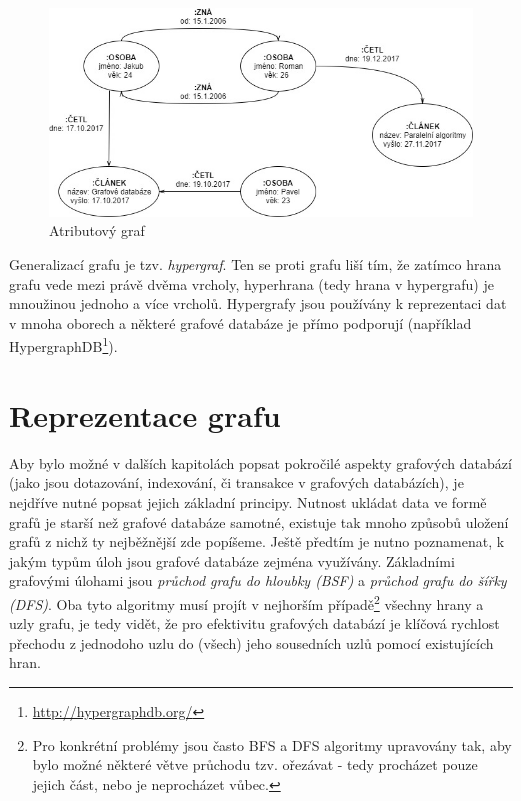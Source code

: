 \begin{figure}
\begin{center}
\includegraphics[width=12cm]{figures/property_graph}
\caption{Atributový graf}
\label{fig:property_graf}
\end{center}
\end{figure}

Generalizací grafu je tzv. \textit{hypergraf}. Ten se proti grafu liší tím, že zatímco hrana grafu vede mezi právě dvěma vrcholy, hyperhrana (tedy hrana v hypergrafu) je mnoužinou jednoho a více vrcholů.\cite{Diestel00} Hypergrafy jsou používány k reprezentaci dat v mnoha oborech a některé grafové databáze je přímo podporují (například HypergraphDB\footnote{\url{http://hypergraphdb.org/}}).


\section{Reprezentace grafu}
\label{sec:gdb-reprezentace}
Aby bylo možné v dalších kapitolách popsat pokročilé aspekty grafových databází (jako jsou dotazování, indexování, či transakce v grafových databázích), je nejdříve nutné popsat jejich základní principy. Nutnost ukládat data ve formě grafů je starší než grafové databáze samotné, existuje tak mnoho způsobů uložení grafů z nichž ty nejběžnější zde popíšeme. Ještě předtím je nutno poznamenat, k jakým typům úloh jsou grafové databáze zejména využívány. Základními grafovými úlohami jsou \textit{průchod grafu do hloubky (BSF)} a \textit{průchod grafu do šířky (DFS)}. Oba tyto algoritmy musí projít v nejhorším případě\footnote{Pro konkrétní problémy jsou často BFS a DFS algoritmy upravovány tak, aby bylo možné některé větve průchodu tzv. ořezávat - tedy procházet pouze jejich část, nebo je neprocházet vůbec.} všechny hrany a uzly grafu, je tedy vidět, že pro efektivitu grafových databází je klíčová rychlost přechodu z jednodoho uzlu do (všech) jeho sousedních uzlů pomocí existujících hran.

